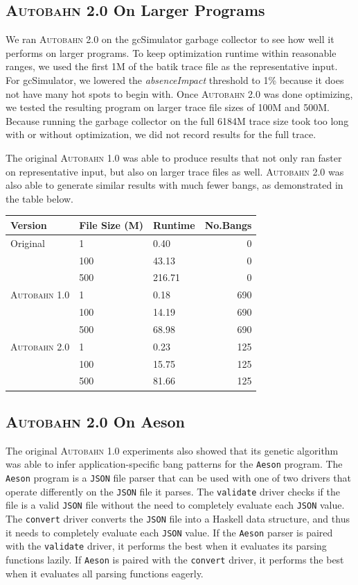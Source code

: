 \documentclass[format=sigplan, review=true]{acmart}
\newcommand{\hotspots}[0]{hot spots}
\newcommand{\Ao}[0]{\textsc{Autobahn 1.0}}
\newcommand{\At}[0]{\textsc{Autobahn 2.0}}
\newcommand{\absim}[0]{\textit{absenceImpact}}
\begin{document}
\subsection{\At{} On Larger Programs}

We ran \At{} on the gcSimulator garbage collector to see how well it performs on larger programs. To keep optimization runtime within reasonable ranges, we used the first 1M of the batik trace file as the representative input. For gcSimulator, we lowered the \absim{} threshold to 1\% because it does not have many \hotspots{} to begin with. Once \At{} was done optimizing, we tested the resulting program on larger trace file sizes of 100M and 500M. Because running the garbage collector on the full 6184M trace size took too long with or without optimization, we did not record results for the full trace. 

The original \Ao{} was able to produce results that not only ran faster on representative input, but also on larger trace files as well. \At{} was also able to generate similar results with much fewer bangs, as demonstrated in the table below. 

\begin{tabular}{lllr}
\hline
Version   & File Size (M) & Runtime & No.Bangs \\
\hline
Original      & 1   &   0.40	 & 0   \\
          & 100        & 43.13      & 0 \\
       & 500     &  216.71 & 0 \\
\Ao{}       & 1     & 0.18    &  690\\
          & 100        & 14.19 &  690\\
                 & 500        & 68.98	& 690\\
\At{}      & 1   &  0.23 & 125    \\
          & 100        & 15.75 & 125      \\
       & 500    & 81.66 & 125    \\

\hline
\end{tabular}
 
\subsection{\At{} On Aeson}
 

 The original \Ao{} experiments also showed that its genetic algorithm was able to infer application-specific bang patterns for the \texttt{Aeson} program. The \texttt{Aeson} program is a \texttt{JSON} file parser that can be used with one of two drivers that operate differently on the \texttt{JSON} file it parses. The \texttt{validate} driver checks if the file is a valid \texttt{JSON} file without the need to completely evaluate each \texttt{JSON} value. The \texttt{convert} driver converts the \texttt{JSON} file into a Haskell data structure, and thus it needs to completely evaluate each \texttt{JSON} value. If the \texttt{Aeson} parser is paired with the \texttt{validate} driver, it performs the best when it evaluates its parsing functions lazily. If \texttt{Aeson} is paired with the \texttt{convert} driver, it performs the best when it evaluates all parsing functions eagerly. 
 
\end{document}
